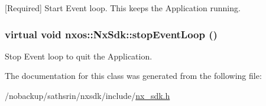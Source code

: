 \label{classnxos_1_1NxSdk_a75ca70643fe325ddf0eea62c1f8c4cc8}
\mbox{[}Required\mbox{]} Start Event loop. This keeps the Application running. \hypertarget{classnxos_1_1NxSdk_adc80e6f244a7cbc050f9dacbc8018315}{
\subsubsection[{stopEventLoop}]{\setlength{\rightskip}{0pt plus 5cm}virtual void nxos::NxSdk::stopEventLoop ()}}
\label{classnxos_1_1NxSdk_adc80e6f244a7cbc050f9dacbc8018315}
Stop Event loop to quit the Application. 

The documentation for this class was generated from the following file:\begin{DoxyCompactItemize}
\item 
/nobackup/sathsrin/nxsdk/include/\hyperlink{nx__sdk_8h}{nx\_\-sdk.h}\end{DoxyCompactItemize}
